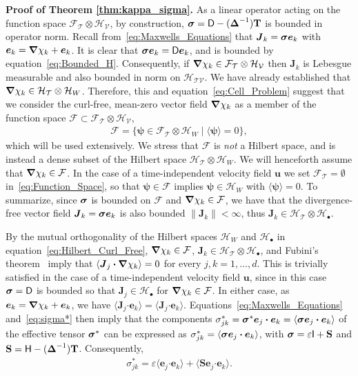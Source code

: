 \documentclass[leqno,onefignum,onetabnum]{siamltex1213}
\newcommand{\Tb}{\mathbf{T}}
\newcommand{\Sb}{\mathbf{S}}
\newcommand{\Tc}{\mathcal{T}}
\newcommand{\Vc}{\mathcal{V}}
\newcommand{\Hc}{\mathcal{H}}
\newcommand{\Fc}{\mathcal{F}}
\newcommand{\Dm}{\mathsf{D}}
\newcommand{\Hm}{\mathsf{H}}
\newcommand{\Ib}{\mathsf{I}}
\newcommand\bsig{\mbox{\boldmath${\sigma}$}}
\newcommand\bDelta{\mbox{\boldmath${\Delta}$}}
\newcommand\bnabla{\mbox{\boldmath${\nabla}$}}
\providecommand\bcdot{\boldsymbol{\cdot}}
\newcommand{\vecJ}{\boldsymbol{J}}
\newcommand{\vecu}{\boldsymbol{u}}
\newcommand{\vece}{\boldsymbol{e}}
\newcommand{\vecpsi}{\boldsymbol{\psi}}
\begin{document}
\textbf{Proof of Theorem \ref{thm:kappa_sigma}.}\hspace{1ex}
%
As a linear operator acting on the function space
$\Fc_{\Tc}\otimes\Hc_{\Vc}$, by construction,
$\bsig=\Dm-(\bDelta^{-1})\Tb$ is bounded in operator norm. Recall
from~\eqref{eq:Maxwells_Equations} that $\vecJ_k=\bsig\vece _k$
with $\vece _k=\bnabla \chi_k+\vece _k$. It is clear that
$\bsig\vece _k=\Dm\vece _k$, and is bounded by
equation~\eqref{eq:Bounded_H}. Consequently, if 
$\bnabla \chi_k\in\Fc_{\Tc}\otimes\Hc_{\Vc}$ then  
$\vecJ_k$ is Lebesgue measurable and also bounded in norm on 
$\Hc_{\Tc\Vc}$. We have already established that 
$\bnabla \chi_k\in\Hc_{\Tc}\otimes\Hc_W$. Therefore, this and
equation~\eqref{eq:Cell_Problem} suggest that we consider the
curl-free, 
mean-zero vector field $\bnabla \chi_k$ as a member of the function space
$\Fc\subset\Fc_{\Tc}\otimes\Hc_{\Vc}$,         
%
\begin{align}\label{eq:Function_Space}
  \Fc=\{\vecpsi\in\Fc_{\Tc}\otimes\Hc_W \;|\; \langle\vecpsi\rangle=0\},  
\end{align}
%
which will be used extensively. We
stress that $\Fc$ is \emph{not} a Hilbert space, and is instead a
dense subset of the Hilbert space $\Hc_{\Tc}\otimes\Hc_W$. We will
henceforth assume that $\bnabla \chi_k\in\Fc$. In the case of a
time-independent velocity field $\vecu $ we set $\Fc_{\Tc}=\emptyset$
in~\eqref{eq:Function_Space}, so that $\vecpsi\in\Fc$ implies  
$\vecpsi\in\Hc_W$ with $\langle\vecpsi\rangle=0$. To summarize, since $\bsig$ is
bounded on $\Fc$ and $\bnabla \chi_k\in\Fc$, we have that the
divergence-free vector field $\vecJ_k=\bsig\vece _k$ is also
bounded $\|\vecJ_k\|<\infty$, thus $\vecJ_k\in\Hc_{\Tc}\otimes\Hc_\bullet$.  






By the mutual orthogonality of the Hilbert spaces $\Hc_W$ and $\Hc_\bullet$
in equation~\eqref{eq:Hilbert_Curl_Free}, 
$\bnabla \chi_k\in\Fc$, $\vecJ_k\in\Hc_{\Tc}\otimes\Hc_\bullet$, and Fubini's
theorem~\cite{Folland:99:RealAnalysis} imply that $\langle\vecJ_j\bcdot\bnabla \chi_k\rangle=0$
for every 
$j,k=1,\ldots,d$. This is trivially 
satisfied in the case of a time-independent velocity field $\vecu $,
since in this case $\bsig=\Dm$ is bounded so that
$\vecJ_j\in\Hc_\bullet$ for $\bnabla \chi_k\in\Fc$. In either case, as
$\vece _k=\bnabla \chi_k+\vece _k$, we have
$\langle\vecJ_j\bcdot\vece _k\rangle=\langle\vecJ_j\bcdot\vece
_k\rangle$. Equations~\eqref{eq:Maxwells_Equations} and~\eqref{eq:sigma*}
then imply that 
the components
$\sigma^*_{jk}=\bsig^*\vece _j\bcdot\vece _k=\langle\bsig\vece _j\bcdot\vece _k\rangle$ of 
the effective tensor $\bsig^*$ can be expressed as
$\sigma^*_{jk}=\langle\bsig\vece _j\bcdot\vece _k\rangle$, with $\bsig=\varepsilon\Ib+\Sb$ and
$\Sb=\Hm-(\bDelta^{-1})\Tb$. Consequently,      
%
\begin{align}\label{eq:Reduction}
  \sigma^*_{jk} %
       =\varepsilon\langle\vece _j\bcdot\vece _k\rangle+\langle\Sb\vece _j\bcdot\vece _k\rangle.      
\end{align}
%
\end{document}
